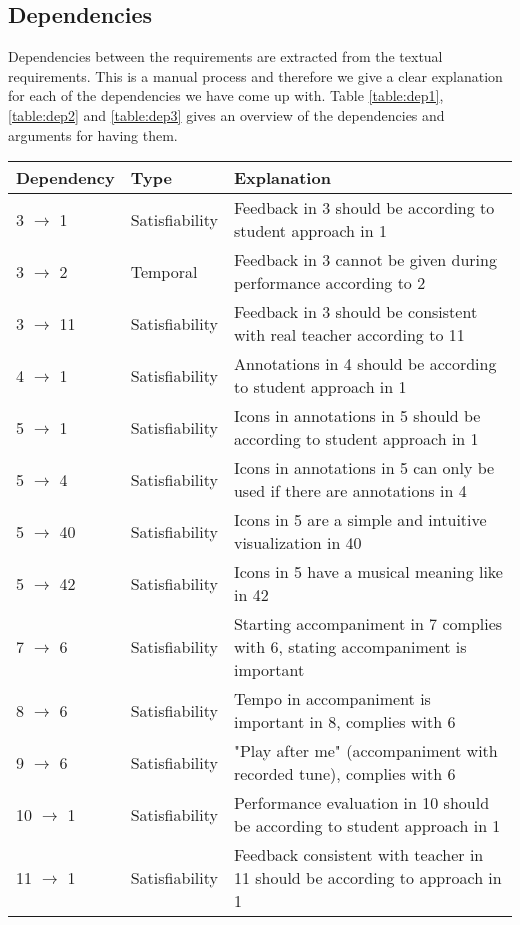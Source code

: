\documentclass[a4paper,11pt]{article}
\begin{document}
		\subsection{Dependencies}
			Dependencies between the requirements are extracted from the textual requirements. This is a manual process and therefore we give a clear explanation for each of the dependencies we have come up with. Table \ref{table:dep1}, \ref{table:dep2} and \ref{table:dep3} gives an overview of the dependencies and arguments for having them.
			\begin{table}[h!]
				\begin{tabular}{l | l | p{10cm}}
					Dependency & Type & Explanation \\ \hline
					3 $\rightarrow$ 1 & Satisfiability & Feedback in 3 should be according to student approach in 1 \\
					3 $\rightarrow$ 2 & Temporal & Feedback in 3 cannot be given during performance according to 2 \\
					3 $\rightarrow$ 11 & Satisfiability & Feedback in 3 should be consistent with real teacher according to 11 \\
					4 $\rightarrow$ 1 & Satisfiability & Annotations in 4 should be according to student approach in 1 \\
					5 $\rightarrow$ 1 & Satisfiability & Icons in annotations in 5 should be according to student approach in 1 \\
					5 $\rightarrow$ 4 & Satisfiability & Icons in annotations in 5 can only be used if there are annotations in 4 \\
					5 $\rightarrow$ 40 & Satisfiability & Icons in 5 are a simple and intuitive visualization in 40 \\
					5 $\rightarrow$ 42 & Satisfiability & Icons in 5 have a musical meaning like in 42 \\
					7 $\rightarrow$ 6 & Satisfiability & Starting accompaniment in 7 complies with 6, stating accompaniment is important \\
					8 $\rightarrow$ 6 & Satisfiability & Tempo in accompaniment is important in 8, complies with 6 \\
					9 $\rightarrow$ 6 & Satisfiability & "Play after me" (accompaniment with recorded tune), complies with 6 \\
					10 $\rightarrow$ 1 & Satisfiability & Performance evaluation in 10 should be according to student approach in 1 \\
					11 $\rightarrow$ 1 & Satisfiability & Feedback consistent with teacher in 11 should be according to approach in 1 \\

\end{tabular}
\end{table}
\end{document}
